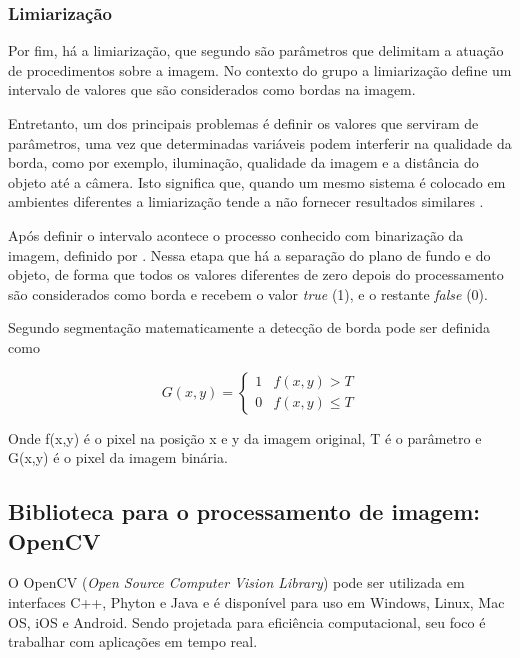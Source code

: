 \documentclass[12pt]{article}
\begin{document}
	\subsubsection{Limiarização}
	
	Por fim, há a limiarização, que segundo \cite{silva2000segmentaccao} são parâmetros que delimitam a atuação de procedimentos sobre a imagem. No contexto do grupo a limiarização define um intervalo de valores que são considerados como bordas na imagem. 
	
	Entretanto, um dos principais problemas é definir os valores que serviram de parâmetros, uma vez que determinadas variáveis podem interferir na qualidade da borda, como por exemplo, iluminação, qualidade da imagem e a distância do objeto até a câmera. Isto significa que, quando um mesmo sistema é colocado em ambientes diferentes a limiarização tende a não fornecer resultados similares \citep{silva2000segmentaccao}. 
	
	Após definir o intervalo acontece o processo conhecido com binarização da imagem, definido por \cite{silva2000segmentaccao}. Nessa etapa que há a separação do plano de fundo e do objeto, de forma que todos os valores diferentes de zero depois do processamento são considerados como borda e recebem o valor \textit{true} (1), e o restante \textit{false} (0).
	
	Segundo segmentação \cite{morgan2008tecnicas} matematicamente a detecção de borda pode ser definida como 
	
	\begin{equation}
	G(x,y)=\begin{cases} 1 & f(x,y)>T \\ 
	
	0 & f(x,y)\le T \end{cases}
	\end{equation}
	
	Onde f(x,y) é o pixel na posição x e y da imagem original, T é o parâmetro e G(x,y) é o pixel da imagem binária.
	
	\subsection{Biblioteca para o processamento de imagem: OpenCV}
	O OpenCV (\textit{Open Source Computer Vision Library}) pode ser utilizada em interfaces C++, Phyton e Java e é disponível para uso em Windows, Linux, Mac OS, iOS e Android. Sendo projetada para eficiência computacional, seu foco é trabalhar com aplicações em tempo real.
	
\end{document}
